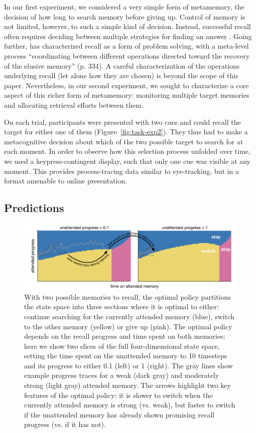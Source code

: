 In our first experiment, we considered a very simple form of metamemory, the decision of how long to search memory before giving up. Control of memory is not limited, however, to such a simple kind of decision. Instead, successful recall often requires deciding between multiple strategies for finding an answer \citep{reder1988strategic}. Going further, \citet{koriat2000control} has characterized recall as a form of problem solving, with a meta-level process ``coordinating between different operations directed toward the recovery of the elusive memory'' (p. 334). A careful characterization of the operations underlying recall (let alone how they are chosen) is beyond the scope of this paper. Nevertheless, in our second experiment, we sought to characterize a core aspect of this richer form of metamemory: monitoring multiple target memories and allocating retrieval efforts between them. 

On each trial, participants were presented with two cues and could recall the target for either one of them (Figure~\ref{fig:task-exp2}). They thus had to make a metacognitive decision about which of the two possible target to search for at each moment. In order to observe how this selection process unfolded over time, we used a keypress-contingent display, such that only one cue was visible at any moment. This provides process-tracing data similar to eye-tracking, but in a format amenable to online presentation.

\subsection{Predictions}

\begin{figure}[t!]
  \centering
  \includegraphics[width=\textwidth]{figs/memory/exp2_predictions.pdf}
  \caption{ 
    With two possible memories to recall, the optimal policy partitions the state space into three sections where it is optimal to either: continue searching for the currently attended memory (blue), switch to the other memory (yellow) or give up (pink). The optimal policy depends on the recall progress and time spent on both memories; here we show two slices of the full four-dimensional state space, setting the time spent on the unattended memory to 10 timesteps and its progress to either 0.1 (left) or 1 (right). The gray lines show example progress traces for a weak (dark gray) and moderately strong (light gray) attended memory. The arrows highlight two key features of the optimal policy: it is slower to switch when the currently attended memory is strong (vs. weak), but faster to switch if the unattended memory has already shown promising recall progress (vs. if it has not).
  }
  \label{fig:exp2_predictions}
\end{figure}


